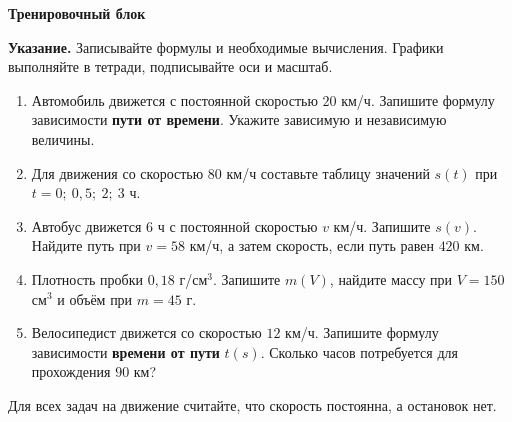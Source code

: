\documentclass[a4paper,12pt]{article}
\begin{document}
\begin{center}
{\LARGE\bfseries\color{darkaccent}Тренировочный блок}\par
\vspace{2mm}{\small Путь А · 10 заданий · от простого к более сложному}\par
\end{center}
\textbf{Указание.} Записывайте формулы и необходимые вычисления. Графики выполняйте в тетради, подписывайте оси и масштаб.
\begin{enumerate}[label=\textcolor{darkaccent}{\textbf{\arabic*.}},leftmargin=1.5em,itemsep=11pt]
\item Автомобиль движется с постоянной скоростью \(20\) км/ч. Запишите формулу зависимости \textbf{пути от времени}. Укажите зависимую и независимую величины.
\item Для движения со скоростью \(80\) км/ч составьте таблицу значений \(s(t)\) при \(t=0;\ 0{,}5;\ 2;\ 3\) ч.
\item Автобус движется \(6\) ч с постоянной скоростью \(v\) км/ч. Запишите \(s(v)\). Найдите путь при \(v=58\) км/ч, а затем скорость, если путь равен \(420\) км.
\item Плотность пробки \(0{,}18\) г/см\(^3\). Запишите \(m(V)\), найдите массу при \(V=150\) см\(^3\) и объём при \(m=45\) г.
\item Велосипедист движется со скоростью \(12\) км/ч. Запишите формулу зависимости \textbf{времени от пути} \(t(s)\). Сколько часов потребуется для прохождения \(90\) км?
\end{enumerate}
\vfill
{\small\color{muted}Для всех задач на движение считайте, что скорость постоянна, а остановок нет.}
\clearpage
\end{document}
